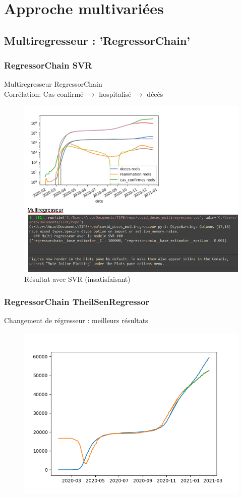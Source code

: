\documentclass{beamer}
\begin{document}
\section{Approche multivariées}
\subsection{Multiregresseur : 'RegressorChain'}
\begin{frame}
	\frametitle{RegressorChain SVR}
	Multiregresseur RegressorChain\\ Corrélation: Cas confirmé $\rightarrow$ hospitalisé $\rightarrow$ décès 
	
	\begin{figure}[h]
		\includegraphics[scale=0.45]{mulitregr_epic_fail}%
		\caption{Résultat avec SVR (insatisfaisant)}
	\end{figure}
\end{frame}

\begin{frame}
	\frametitle{RegressorChain TheilSenRegressor}
	Changement de régresseur : meilleurs résultats
	\begin{figure}[h]
		\includegraphics[scale=0.45]{TheilSenRegressor multivariable to predict deces}
	\end{figure}
\end{frame}
\end{document}
